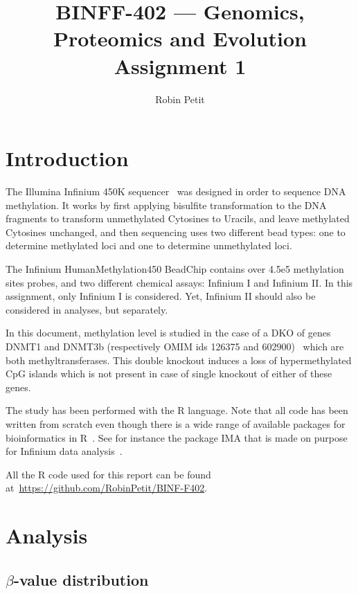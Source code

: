 \documentclass{article}
\title{BINFF-402 --- Genomics, Proteomics and Evolution \\ Assignment 1}
\author{Robin Petit}
\begin{document}
\maketitle

\section{Introduction}

The Illumina Infinium 450K sequencer~\cite{infinium450} was designed in order to sequence DNA methylation. It works by first applying
bisulfite transformation to the DNA fragments to transform unmethylated Cytosines to Uracils, and leave methylated Cytosines unchanged,
and then sequencing uses two different bead types: one to determine methylated loci and one to determine unmethylated
loci.~\cite{weisenberger2008comprehensive}

The Infinium HumanMethylation450 BeadChip contains over 4.5e5 methylation sites probes, and two different chemical assays: Infinium I and
Infinium II. In this assignment, only Infinium I is considered. Yet, Infinium II should also be considered in analyses, but
separately.~\cite{dedeurwaerder2011evaluation}

In this document, methylation level is studied in the case of a DKO of genes DNMT1 and DNMT3b (respectively OMIM ids 126375 and 602900)~\cite{amberger2008OMIM}
which are both methyltransferases. This double knockout induces a loss of hypermethylated CpG islands which is not present in case of
single knockout of either of these genes.~\cite{paz2003genetic}

The study has been performed with the R language. Note that all code has been written from scratch even though there is a wide range of
available packages for bioinformatics in R~\cite{gentleman2004bioconductor}. See for instance the package IMA that is made on purpose
for Infinium data analysis~\cite{wang2012ima}.

All the R code used for this report can be found at~\url{https://github.com/RobinPetit/BINF-F402}.

\section{Analysis}
\subsection{$\beta$-value distribution}
\end{document}
